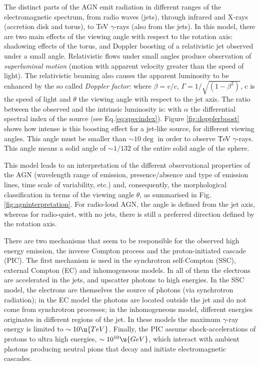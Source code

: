 The distinct parts of the AGN emit radiation in different ranges of
the electromagnetic spectrum, from radio waves (jets), through
infrared and X-rays (accretion disk and torus), to TeV $\gamma$-rays
(also from the jets).  In this model, there are two main effects of
the viewing angle with respect to the rotation axis: shadowing effects
of the torus, and Doppler boosting of a relativistic jet observed
under a small angle.  Relativistic flows under small angles produce
observation of \emph{superluminal motion} (motion with apparent
velocity greater than the speed of light).  The relativistic beaming
also causes the apparent luminosity to be enhanced by the so called
\emph{Doppler factor}:
%
\dopplerfactoreq
%
where $\beta = v/c$, $\Gamma=1/\sqrt{\left(1-\beta^2\right)}$, c is
the speed of light and $\theta$ the viewing angle with respect to the
jet axis. The ratio between the observed and the intrinsic luminosity
is:
%
\ratiolumeq
%
with $\alpha$ the differential spectral index of the source (see
Eq.\eqref{eq:specindex}). Figure \ref{fig:dopplerboost} shows how
intense is this boosting effect for a jet-like source, for different
viewing angles.  This angle must be smaller than $\sim 10\deg$ in
order to observe \u{TeV} $\gamma$-rays.  This angle means a solid
angle of $\sim 1/132$ of the entire solid angle of the sphere. 

\agninterpretationfig
%
This model leads to an interpretation of the different observational
properties of the AGN (wavelength range of emission, presence/absence
and type of emission lines, time scale of variability, etc.) and,
consequently, the morphological classification in terms of the viewing
angle $\theta$, as summarised in Fig.  \ref{fig:agninterpretation}.
For radio-loud AGN, the angle is defined from the jet axis, whereas
for radio-quiet, with no jets, there is still a preferred direction
defined by the rotation axis.

There are two mechanisms that seem to be responsible for the observed
high energy emission, the inverse Compton process and the
proton-initiated cascade (PIC). The first mechanism is used in the
synchrotron self-Compton (SSC), external Compton (EC) and inhomogeneous
models. In all of them the electrons are accelerated in the jets, and
upscatter photons to high energies. In the SSC model, the electrons
are themselves the source of photons (via synchrotron radiation); in
the EC model the photons are located outside the jet and do not come
from synchrotron processes; in the inhomogeneous model, different
energies originates in different regions of the jet. In these models
the maximum $\gamma$-ray energy is limited to $\sim 10\u{TeV}$.
Finally, the PIC assume shock-accelerations of protons to ultra high
energies, $\sim 10^{10}\u{GeV}$, which interact with ambient photons
producing neutral pions that decay and initiate electromagnetic
cascades.

